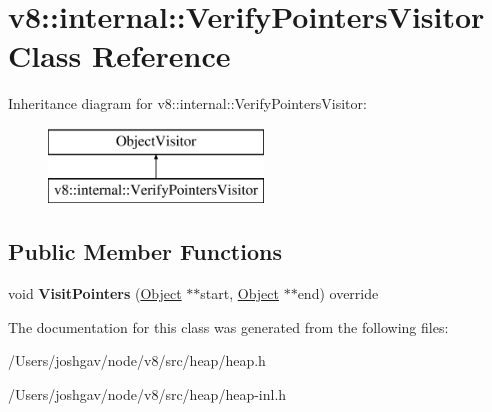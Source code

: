 \hypertarget{classv8_1_1internal_1_1_verify_pointers_visitor}{}\section{v8\+:\+:internal\+:\+:Verify\+Pointers\+Visitor Class Reference}
\label{classv8_1_1internal_1_1_verify_pointers_visitor}
Inheritance diagram for v8\+:\+:internal\+:\+:Verify\+Pointers\+Visitor\+:\begin{figure}[H]
\begin{center}
\leavevmode
\includegraphics[height=2.000000cm]{classv8_1_1internal_1_1_verify_pointers_visitor}
\end{center}
\end{figure}
\subsection*{Public Member Functions}
\begin{DoxyCompactItemize}
\item 
void {\bfseries Visit\+Pointers} (\hyperlink{classv8_1_1internal_1_1_object}{Object} $\ast$$\ast$start, \hyperlink{classv8_1_1internal_1_1_object}{Object} $\ast$$\ast$end) override\hypertarget{classv8_1_1internal_1_1_verify_pointers_visitor_aba0beaaa2ff9787bc6ed4921abc1c98f}{}\label{classv8_1_1internal_1_1_verify_pointers_visitor_aba0beaaa2ff9787bc6ed4921abc1c98f}

\end{DoxyCompactItemize}


The documentation for this class was generated from the following files\+:\begin{DoxyCompactItemize}
\item 
/\+Users/joshgav/node/v8/src/heap/heap.\+h\item 
/\+Users/joshgav/node/v8/src/heap/heap-\/inl.\+h\end{DoxyCompactItemize}
